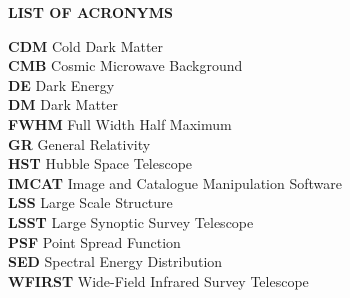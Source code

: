 \documentclass[12pt, preprint,letterpaper]{article}
\begin{document}
%
\thispagestyle{empty}
\begin{center}
\textbf{LIST OF ACRONYMS}
\end{center}
\textbf{CDM}    \hspace{9.5mm} Cold Dark Matter \\
\textbf{CMB}    \hspace{10mm} Cosmic Microwave Background \\
\textbf{DE}     \hspace{15mm} Dark Energy \\
\textbf{DM}     \hspace{14mm} Dark Matter \\
\textbf{FWHM}   \hspace{6mm} Full Width Half Maximum \\
\textbf{GR}     \hspace{15mm} General Relativity \\
\textbf{HST}    \hspace{13mm} Hubble Space Telescope \\
\textbf{IMCAT}  \hspace{7mm} Image and Catalogue Manipulation Software \\
\textbf{LSS}    \hspace{15mm} Large Scale Structure \\
\textbf{LSST}   \hspace{12mm} Large Synoptic Survey Telescope \\
\textbf{PSF}    \hspace{14mm} Point Spread Function \\
\textbf{SED}    \hspace{14mm} Spectral Energy Distribution \\
\textbf{WFIRST} \hspace{4mm}  Wide-Field Infrared Survey Telescope \\

\newpage
%
%
%
%
\end{document}
